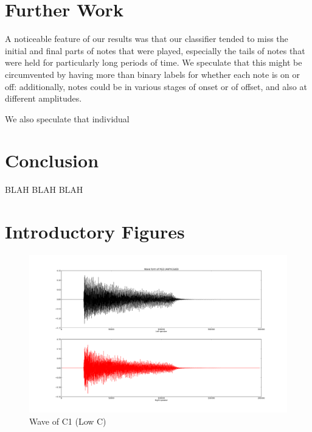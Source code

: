 \documentclass{article}
\begin{document}
\section{Further Work}


A noticeable feature of our results was that our classifier tended to miss the
initial and final parts of notes that were played, especially the tails of
notes that were held for particularly long periods of time.
We speculate that this might be circumvented by having more than binary labels
for whether each note is on or off: additionally, notes could be in various
stages of onset or of offset, and also at different amplitudes.

We also speculate that individual 

\section{Conclusion}

BLAH BLAH BLAH





\section{Introductory Figures}
\begin{figure}
\includegraphics[scale=.13]{wave_m23.png}
\caption{Wave of C1 (Low C)}
\label{fig:wave}
\end{figure}
\end{document}
